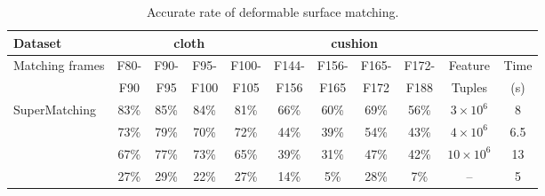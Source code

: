 \begin{table}[tb]
\centering
\tabcolsep=1pt
\setlength{\aboverulesep}{0pt}
\setlength{\belowrulesep}{0pt}
\caption{Accurate rate of deformable surface matching.}
\hspace{-5ex}
\label{tab:errorrate1}
\small
\begin{tabular}{l|c c c c | c c c c | c c}
\toprule
{Dataset}  & \multicolumn{4}{|c|}{ {cloth}} & \multicolumn{4}{c|}{ {cushion}} & & \\
\hline
 {Matching frames} &  {F80-}	&  {F90-}	& {F95-}	& {F100-} & {F144-} & {F156-}	& {F165-}	& {F172-} & {Feature}	& {Time}  \\
 {}                &  {F90 }    &  {F95 }   & {F100}    & {F105}  & {F156}  & {F165}    & {F172}    & {F188}  & {Tuples}    &  {(s)} \\
\hline
 {SuperMatching}   &  {83\%}    &  {85\%}	& {84\%} 	& {81\%}  & {66\%}	& {60\%}	& {69\%}	& {56\%}  &  {$3\times10^6$}  &  {8}  \\
 {\cite{Zass08}}   & {73\%}	    & {79\%}	& {70\%}	& {72\%}  & {44\%}  & {39\%}    & {54\%}	& {43\%}   & {$4\times10^6$}   & {6.5}  \\
{\cite{Duchenne09}} & {67\%}    & {77\%}    & {73\%}	& {65\%}  & {39\%}	& {31\%}	& {47\%}	& {42\%}   & {$10\times10^6$}  & {13}  \\
 {\cite{Cour06}}   & {27\%}     & {29\%}	&  {22\%}	& {27\%}  & {14\%}  & {5\%}	    & {28\%}	& {7\%}    & {--}       & {5}  \\
\bottomrule
\end{tabular}%
\end{table}%

